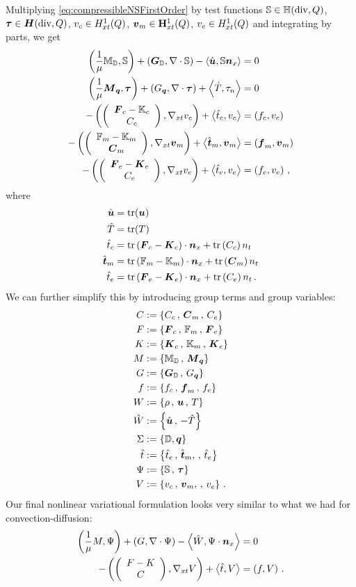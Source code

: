 \documentclass[Dissertation.tex]{subfiles}
\begin{document}
Multiplying \eqref{eq:compressibleNSFirstOrder} by test functions $\bbS\in\bbH(\text{div},Q)$,
$\bftau\in\HdivxQ$, $v_c\in\HonextQ$, $\bfv_m\in\mathbf{H}_{xt}^1(Q)$, $v_e\in\HonextQ$ and integrating by parts,
we get
\begin{subequations}
\label{eq:compressibleNSNonlinear}
\begin{align}
	\LRp{\frac{1}{\mu}\bbM_\bbD,\bbS}+\LRp{\bfG_\bbD,\Div\bbS}-\LRa{\hat\bfu,\bbS\bfn_x}&=0\\
	\LRp{\frac{1}{\mu}\bfM_{\bfq},\bftau}+\LRp{G_{\bfq},\Div\bftau}+\LRa{\hat T,\tau_n}&=0\\
	-\LRp{\vecttwo{\bfF_c-\bbK_c}{C_c},\Gradxt v_c}+\LRa{\hat t_c,v_c}&=\LRp{f_c,v_c}\\
	-\LRp{\vecttwo{\bbF_m-\bbK_m}{\bfC_m},\Gradxt\bfv_m}+\LRa{\hat\bft_m,\bfv_m}&=\LRp{\bff_m,\bfv_m}\\
	-\LRp{\vecttwo{\bfF_e-\bfK_e}{C_e},\Gradxt v_e}+\LRa{\hat t_e,v_e}&=\LRp{f_e,v_e}\,,
\end{align}
\end{subequations}
where 
\begin{equation*}
\begin{aligned}
\hat\bfu&=\trace(\bfu)\\
\hat T&=\trace(T)\\
\hat t_c&=\trace\LRp{\bfF_c-\bfK_c}\cdot\bfn_x+\trace\LRp{C_c}n_t\\
\hat\bft_m&=\trace\LRp{\bbF_m-\bbK_m}\cdot\bfn_x+\trace\LRp{\bfC_m} n_t\\
\hat t_e&=\trace\LRp{\bfF_e-\bfK_e}\cdot\bfn_x+\trace\LRp{C_e}n_t\,.
\end{aligned}
\end{equation*}
We can further simplify this by introducing group terms and group variables:
\begin{align*}
C&:=\LRc{C_c\,,\, \bfC_m\,,\, C_e}\\
F&:=\LRc{\bfF_c\,,\, \bbF_m\,,\, \bfF_e}\\
K&:=\LRc{\bfK_c\,,\, \bbK_m\,,\, \bfK_e}\\
M&:=\LRc{\bbM_{\bbD}\,,\, \bfM_{\bfq}}\\
G&:=\LRc{\bfG_{\bbD}\,,\, G_{\bfq}}\\
f&:=\LRc{f_c\,,\, \bff_m\,,\, f_e}\\
W&:=\LRc{\rho\,,\,\bfu\,,\,T}\\
\hat W&:=\LRc{\hat\bfu\,,\,-\hat T}\\
\Sigma&:=\LRc{\bbD,\bfq}\\
\hat t&:=\LRc{\hat t_e\,,\,\hat\bft_m,\,,\,\hat t_e}\\
\Psi&:=\LRc{\bbS\,,\,\bftau}\\
V&:=\LRc{v_c\,,\,\bfv_m,\,,\,v_e}\,.
\end{align*}
Our final nonlinear variational formulation looks very similar to what we had for convection-diffusion:
\begin{align*}
\LRp{\frac{1}{\mu}M,\Psi}+\LRp{G,\Div\Psi}-\LRa{\hat W,\Psi\cdot\bfn_x}&=0\\
-\LRp{\vecttwo{F-K}{C},\Gradxt V}+\LRa{\hat t,V}&=\LRp{f,V}\,.
\end{align*}
\end{document}
